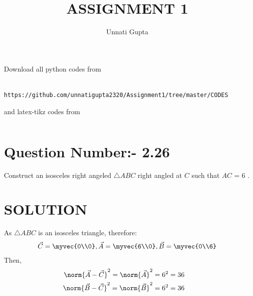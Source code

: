 \documentclass[journal,12pt,twocolumn]{IEEEtran}
\begin{document}
\title{ASSIGNMENT 1}
\author{Unnati Gupta}

\maketitle
\newpage

\bigskip
\renewcommand{\thefigure}{\theenumi}
\renewcommand{\thetable}{\theenumi}
Download all python codes from 
\begin{lstlisting}

https://github.com/unnatigupta2320/Assignment1/tree/master/CODES
\end{lstlisting}
%
and latex-tikz codes from 
%
\begin{lstlisting}

\end{lstlisting}
%
\section{Question Number:- 2.26}
Construct an isosceles right angeled $\triangle ABC$  right angled at $C$ such that 
$AC$ = 6 .
%
\section{SOLUTION}
As $\triangle ABC$ is an isosceles triangle, therefore:
\begin{align}
\vec{C} = \myvec{0\\0},
\vec{A} = \myvec{6\\0}, 
\vec{B} = \myvec{0\\6}
\end{align}
Then,
\begin{align}
\norm{\vec{A}-\vec{C}}^2 = \norm{\vec{A}}^2 =6^2=36   \quad 
\\
\norm{\vec{B}-\vec{C}}^2 = \norm{\vec{B}}^2 =6^2=36 \quad 
\end{align}
\end{document}
